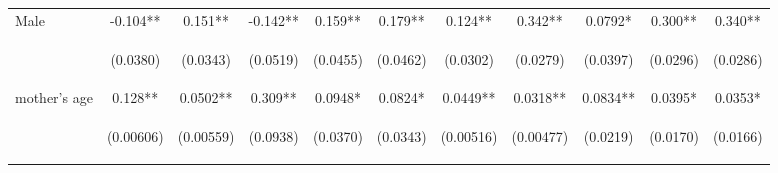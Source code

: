 \documentclass{article}[11pt,subeqn]
\begin{document}
\begin{spacing}{1.5}
\begin{sidewaystable}[!htbp]
\begin{center}
\begin{tabular}{lcccccccccc}
Male	&	-0.104**	&	0.151**	&	-0.142**	&	0.159**	&	0.179**	&	0.124**	&	0.342**	&	0.0792*	&	0.300**	&	0.340**	\\
\vspace{4pt} & \begin{footnotesize}		(0.0380)	\end{footnotesize} & \begin{footnotesize}	(0.0343)	\end{footnotesize} & \begin{footnotesize}	(0.0519)	\end{footnotesize} & \begin{footnotesize}	(0.0455)	\end{footnotesize} & \begin{footnotesize}	(0.0462)	\end{footnotesize} & \begin{footnotesize}	(0.0302)	\end{footnotesize} & \begin{footnotesize}	(0.0279)	\end{footnotesize} & \begin{footnotesize}	(0.0397)	\end{footnotesize} & \begin{footnotesize}	(0.0296)	\end{footnotesize} & \begin{footnotesize}	(0.0286)	\end{footnotesize} \\
mother's age &	0.128**	&	0.0502**	&	0.309**	&	0.0948*	&	0.0824*	&	0.0449**	&	0.0318**	&	0.0834**	&	0.0395*	&	0.0353*	\\
\vspace{4pt} & \begin{footnotesize}		(0.00606)	\end{footnotesize} & \begin{footnotesize}	(0.00559)	\end{footnotesize} & \begin{footnotesize}	(0.0938)	\end{footnotesize} & \begin{footnotesize}	(0.0370)	\end{footnotesize} & \begin{footnotesize}	(0.0343)	\end{footnotesize} & \begin{footnotesize}	(0.00516)	\end{footnotesize} & \begin{footnotesize}	(0.00477)	\end{footnotesize} & \begin{footnotesize}	(0.0219)	\end{footnotesize} & \begin{footnotesize}	(0.0170)	\end{footnotesize} & \begin{footnotesize}	(0.0166)	\end{footnotesize} \\

\end{tabular}
\end{center}
\end{sidewaystable}
\end{spacing}
\end{document}
